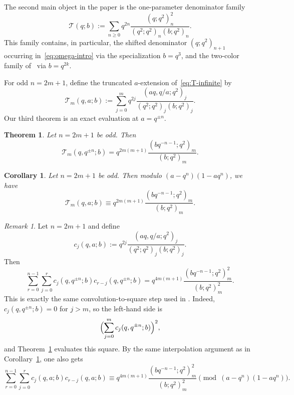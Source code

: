 \documentclass[reqno]{amsart}
\theoremstyle{definition}
\theoremstyle{plain}
\newtheorem{theorem}{Theorem}
\newtheorem{corollary}{Corollary}
\theoremstyle{remark}
\newtheorem{remark}{Remark}
\newcommand{\T}{\mathcal{T}}
\numberwithin{equation}{section}
\begin{document}
The second main object in the paper is the one-parameter denominator family
\begin{equation}\label{eq:T-infinite}
\T(q;b):=\sum_{n\ge 0} q^{2n}\frac{(q;q^2)_n^2}{(q^2;q^2)_n(b;q^2)_n}.
\end{equation}
This family contains, in particular, the shifted denominator $(q;q^2)_{n+1}$ occurring in~\eqref{eq:omega-intro} via the specialization $b=q^3$, and the two-color family of~\cite{andrews-elbachraoui} via $b=q^{2k}$.

For odd $n=2m+1$, define the truncated $a$-extension of~\eqref{eq:T-infinite} by
\begin{equation}\label{eq:Tmb}
\T_m(q,a;b):=\sum_{j=0}^{m} q^{2j}\frac{(aq,q/a;q^2)_j}{(q^2;q^2)_j(b;q^2)_j}.
\end{equation}
Our third theorem is an exact evaluation at $a=q^{\pm n}$.

\begin{theorem}\label{thm:free-b}
Let $n=2m+1$ be odd. Then
\begin{equation}\label{eq:Tmb-exact}
\T_m(q,q^{\pm n};b)=q^{2m(m+1)}\frac{(bq^{-n-1};q^2)_m}{(b;q^2)_m}.
\end{equation}
\end{theorem}

\begin{corollary}\label{cor:Tmb-micro}
Let $n=2m+1$ be odd. Then modulo $(a-q^n)(1-aq^n)$, we have
\begin{equation}\label{eq:Tmb-micro}
\T_m(q,a;b)\equiv q^{2m(m+1)}\frac{(bq^{-n-1};q^2)_m}{(b;q^2)_m}.
\end{equation}
\end{corollary}

\begin{remark}
Let $n=2m+1$ and define
\[
c_j(q,a;b):=q^{2j}\frac{(aq,q/a;q^2)_j}{(q^2;q^2)_j(b;q^2)_j}.
\]
Then
\[
\sum_{r=0}^{n-1}\sum_{j=0}^{r} c_j(q,q^{\pm n};b)c_{r-j}(q,q^{\pm n};b)
=
q^{4m(m+1)}\frac{(bq^{-n-1};q^2)_m^2}{(b;q^2)_m^2}.
\]
This is exactly the same convolution-to-square step used in
\cite[Lemma~1(a) and equation~(14)]{elbachraoui-squares}. Indeed,
$c_j(q,q^{\pm n};b)=0$ for $j>m$, so the left-hand side is
\[
\Bigl(\sum_{j=0}^{m} c_j(q,q^{\pm n};b)\Bigr)^2,
\]
and Theorem~\ref{thm:free-b} evaluates this square. By the same interpolation argument as in Corollary~\ref{cor:Tmb-micro}, one also gets
\[
\sum_{r=0}^{n-1}\sum_{j=0}^{r} c_j(q,a;b)c_{r-j}(q,a;b)
\equiv
q^{4m(m+1)}\frac{(bq^{-n-1};q^2)_m^2}{(b;q^2)_m^2}
\pmod{(a-q^n)(1-aq^n)}.
\]
\end{remark}
\end{document}
